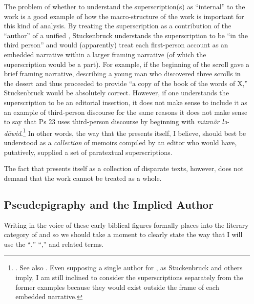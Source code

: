 The problem of whether to understand the superscription(s) as ``internal'' to the work is a good example of how the macro-structure of the work is important for this kind of analysis. By treating the superscription as a contribution of the ``author'' of a unified \ga, Stuckenbruck understands the superscription to be ``in the third person'' and would (apparently) treat each first-person account as an embedded narrative within a larger framing narrative (of which the superscription would be a part). For example, if the beginning of the scroll gave a brief framing narrative, describing a young man who discovered three scrolls in the desert and thus proceeded to provide ``a copy of the book of the words of X,'' Stuckenbruck would be absolutely correct. However, if one understands the superscription to be an editorial insertion, it does not make sense to include it as an example of third-person discourse for the same reasons it does not make sense to say that Ps 23 uses third-person discourse by beginning with \emph{mizmôr lə-dāwid}.\footnote{\cite[315--316]{stuckenbruck_roitman-etal2011}. See also \cite[15--16]{bernstein_chazon-etal1999}. Even supposing a single author for \ga, as Stuckenbruck and others imply, I am still inclined to consider the superscriptions separately from the former examples because they would exist outside the frame of each embedded narrative.}
In other words, the way that the \ga presents itself, I believe, should best be understood as a \emph{collection} of memoirs compiled by an editor who would have, putatively, supplied a set of paratextual superscriptions.

The fact that \ga presents itself as a collection of disparate texts, however, does not demand that the work cannot be treated as a whole.
 
 
 \subsection{Pseudepigraphy and the Implied Author}
 Writing in the voice of these early biblical figures formally places \ga into the literary category of \psy and so we should take a moment to clearly state the way that I will use the ``\psy,'' ``\psa,'' and related terms.\autocites[The topic of \psy has received a large amount of very sophisticated attention in recent years. See especially][]{mroczek2016}{tigchelaar_tigchelaar2014}{reed_towsend-moulie2011}{reed_jts2009}{reed_ditomasso-turcescu2008}{najman_hilhorst-puech2007}{najman2003}


